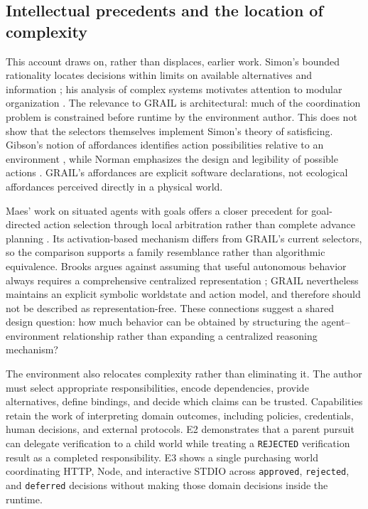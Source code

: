 \documentclass[11pt]{article}
\begin{document}
\subsection{Intellectual precedents and the location of complexity}
This account draws on, rather than displaces, earlier work. Simon's bounded rationality locates decisions within limits on available alternatives and information \cite{Simon1955}; his analysis of complex systems motivates attention to modular organization \cite{Simon1962}. The relevance to GRAIL is architectural: much of the coordination problem is constrained before runtime by the environment author. This does not show that the selectors themselves implement Simon's theory of satisficing. Gibson's notion of affordances identifies action possibilities relative to an environment \cite{Gibson1979}, while Norman emphasizes the design and legibility of possible actions \cite{Norman1988}. GRAIL's affordances are explicit software declarations, not ecological affordances perceived directly in a physical world.

Maes' work on situated agents with goals offers a closer precedent for goal-directed action selection through local arbitration rather than complete advance planning \cite{Maes1990}. Its activation-based mechanism differs from GRAIL's current selectors, so the comparison supports a family resemblance rather than algorithmic equivalence. Brooks argues against assuming that useful autonomous behavior always requires a comprehensive centralized representation \cite{Brooks1991}; GRAIL nevertheless maintains an explicit symbolic worldstate and action model, and therefore should not be described as representation-free. These connections suggest a shared design question: how much behavior can be obtained by structuring the agent--environment relationship rather than expanding a centralized reasoning mechanism?

The environment also relocates complexity rather than eliminating it. The author must select appropriate responsibilities, encode dependencies, provide alternatives, define bindings, and decide which claims can be trusted. Capabilities retain the work of interpreting domain outcomes, including policies, credentials, human decisions, and external protocols. E2 demonstrates that a parent pursuit can delegate verification to a child world while treating a \texttt{REJECTED} verification result as a completed responsibility. E3 shows a single purchasing world coordinating HTTP, Node, and interactive STDIO across \texttt{approved}, \texttt{rejected}, and \texttt{deferred} decisions without making those domain decisions inside the runtime.
\end{document}
